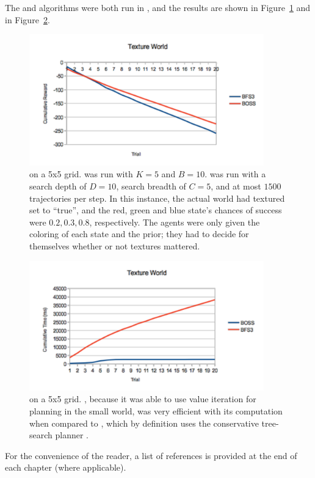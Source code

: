 The  and  algorithms were both run in , and the results are shown in Figure~\ref{sec:expr:tworld-reward} and in Figure~\ref{sec:expr:tworld-time}.


\begin{figure}
\vskip 0.2in
\begin{center}
\centerline{\includegraphics[width=4in]{tworld-reward}}
\caption{
 on a 5x5 grid.  was run with $K=5$ and $B=10$.  was run with a search depth of $D=10$, search breadth of $C=5$, and at most $1500$ trajectories per step. In this instance, the actual world had textured set to ``true'', and the red, green and blue state's chances of success were $0.2, 0.3, 0.8$, respectively. The agents were only given the coloring of each state and the prior; they had to decide for themselves whether or not textures mattered.
}
\label{sec:expr:tworld-reward}
\end{center}
\vskip -0.2in
\end{figure} 


\begin{figure}
\vskip 0.2in
\begin{center}
\centerline{\includegraphics[width=4in]{tworld-time}}
\caption{
 on a 5x5 grid. , because it was able to use value iteration for planning in the small world, was very efficient with its computation when compared to , which by definition uses the conservative tree-search planner .
}
\label{sec:expr:tworld-time}
\end{center}
\vskip -0.2in
\end{figure} 

%
\ifperchapterbib%
For the convenience of the reader, a list of references is provided at the end of each chapter (where applicable).
\ifendbib%
\else\fi%
\else\fi%
